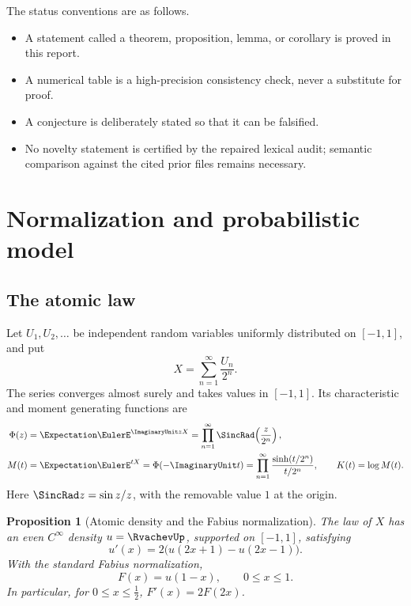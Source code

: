 \documentclass[11pt,oneside]{article}
\newtheorem{proposition}[theorem]{Proposition}
\theoremstyle{definition}
\theoremstyle{remark}
\begin{document}
The status conventions are as follows.

\begin{itemize}[leftmargin=2em]
\item A statement called a theorem, proposition, lemma, or corollary is proved
      in this report.
\item A numerical table is a high-precision consistency check, never a
      substitute for proof.
\item A conjecture is deliberately stated so that it can be falsified.
\item No novelty statement is certified by the repaired lexical audit;
      semantic comparison against the cited prior files remains necessary.
\end{itemize}

\section{Normalization and probabilistic model}

\subsection{The atomic law}

Let \(U_1,U_2,\ldots\) be independent random variables uniformly distributed
on \([-1,1]\), and put
\begin{equation}
 X=\sum_{n=1}^{\infty}\frac{U_n}{2^n}.
 \label{eq:X}
\end{equation}
The series converges almost surely and takes values in \([-1,1]\).  Its
characteristic and moment generating functions are
\begin{align}
 \Phi(z)
   &=\Expectation \EulerE^{\ImaginaryUnit zX}
     =\prod_{n=1}^{\infty}
       \SincRad\!\left(\frac{z}{2^n}\right),
 \label{eq:Phi-def}\\
 M(t)
   &=\Expectation \EulerE^{tX}
     =\Phi(-\ImaginaryUnit t)
     =\prod_{n=1}^{\infty}
       \frac{\sinh(t/2^n)}{t/2^n},
 \qquad
 K(t)=\log M(t).
 \label{eq:M-def}
\end{align}
Here \(\SincRad z=\sin z/z\), with the removable value \(1\) at the origin.

\begin{proposition}[Atomic density and the Fabius normalization]
\label{prop:density}
The law of \(X\) has an even \(C^\infty\) density \(u=\RvachevUp\), supported on
\([-1,1]\), satisfying
\begin{equation}
 u'(x)=2\bigl(u(2x+1)-u(2x-1)\bigr).
 \label{eq:up-de}
\end{equation}
With the standard Fabius normalization,
\begin{equation}
 F(x)=u(1-x),\qquad 0\leq x\leq1.
 \label{eq:F-up}
\end{equation}
In particular, for \(0\leq x\leq\frac12\),
\(F'(x)=2F(2x)\).
\end{proposition}
\end{document}
